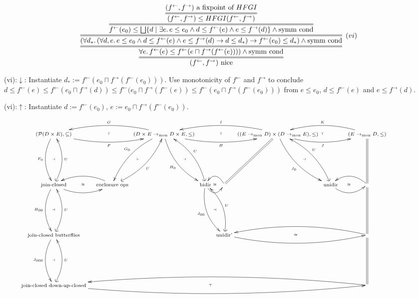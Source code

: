 \documentclass[9pt]{article}
\newcommand{\Pow}{\mathcal{P}}
\newcommand{\tomon}{\to_{\mathrm{mon}}}
\newcommand{\ff}{{f^{\rightarrow}}}
\newcommand{\fb}{{f^{\leftarrow}}}
\newcommand{\bigjoin}{\bigsqcup}
\newcommand{\meet}{\sqcap}
\newcommand{\con}{\wedge}
\newcommand{\imp}{\to}
\begin{document}
\[
\infer={(\fb, \ff) \textrm{~nice}}{
  \infer={\forall e.\, \fb(e) \leq \fb(e \meet \ff(\fb(e)))) \con \textrm{symm cond}}{
    \infer=[(vi)]{(\forall d_*.\, (\forall d,e.\, e \leq e_0 \con d \leq \fb(e) \con e \leq \ff(d) \imp d \leq d_*) \imp \fb(e_0) \leq d_*) \con \textrm{symm cond}}{
      \infer={\fb(e_0) \leq \bigjoin \{d \mid \exists e.\, e \leq e_0 \con d \leq \fb(e) \con e \leq \ff(d)\} \con \textrm{symm cond}}{
        \infer={(\fb,\ff) \leq HFGI(\fb,\ff)}{
          (\fb,\ff) \textrm{~a fixpoint of $HFGI$}
        }
      }
    }
  }
}  
\]  

(vi):$\downarrow$: Instantiate $d_* := \fb(e_0 \meet \ff(\fb(e_0)))$.
Use monotonicity of $\fb$ and $\ff$ to conclude
$d \leq \fb(e) \leq \fb(e_0 \meet \ff(d)) \leq
\fb(e_0 \meet \ff(\fb(e)) \leq \fb(e_0 \meet \ff(\fb(e_0)))$ from $e \leq e_0$,
$d \leq \fb(e)$ and $e \leq \ff(d)$.

(vi):$\uparrow$: Instantiate $d := \fb(e_0)$,
$e := e_0 \meet \ff(\fb(e_0))$.




\[
  \scriptsize
\hspace*{-1.5cm}  
\xymatrix@R=5pc@C=0.1pc{  
  (\Pow(D \times E), \subseteq) \ar@/_1pc/[rrr]_{F} \ar@{}[rrr]|{\top}
  \ar@/_1pc/[d]_{F_0}  \ar@{}[d]|{\dashv}
& & & (D \times E \tomon D \times E, \leq) \ar@/_1pc/[rrr]_{H} \ar@{}[rrr]|{\top}
\ar@/_1pc/[lll]_{G}
\ar@/_1pc/[dl]_{G_0} \ar@{}[dl]|{\vdash}
\ar@/_1pc/[dr]_{H_0} \ar@{}[dr]|{\dashv}
      & & & ((E \tomon D) \times (D \tomon E), \leq)
      \ar@/_1pc/[lll]_{I} \ar@{=}[dl]
      \ar@/_1pc/[rrr]_{J} \ar@{}[rrr]|{\top}
       \ar@/_1pc/[dr]_{J_0} \ar@{}[dr]|{\dashv}
             & & & (E \tomon D, \leq) \ar@{=}[d]
                \ar@/_1pc/[lll]_{K} \\
\textrm{join-closed} \ar@/_1pc/[rr] \ar@{}[rr]|{\cong}
        \ar@/_1pc/[d]_{H_{00}} \ar@{}[d]|{\dashv} \ar@{(->}@/_1pc/[u]_{U}      & & \textrm{coclosure ops} \ar@/_1pc/[ll]  \ar@{(->}@/_1pc/[ur]_{U}   
    & & \textrm{bidir} \ar@/_1pc/[r] \ar@{}[r]|{\cong}  \ar@{(->}@/_1pc/[ul]_U
   \ar@/_1pc/[dr]_{J_{00}} \ar@{}[dr]|{\dashv}
        & \ar@/_1pc/[l] 
          & & \textrm{unidir} \ar@/_1pc/[rr] \ar@{}[rr]|{\cong}  \ar@{(->}@/_1pc/[ul]_U
          & & \ar@/_1pc/[ll] \ar@{=}[d]\\
\textrm{join-closed butterflies} 
    \ar@/_1pc/[d]_{J_{000}} \ar@{}[d]|{\dashv} \ar@{(->}@/_1pc/[u]_{U}
& & 
    & & & \textrm{unidir'} \ar@{(->}@/_1pc/[ul]_{U}
            \ar@/_1pc/[rrrr] \ar@{}[rrrr]|{\cong}
          & 
            & & & \ar@{=}[d] \ar@/_1pc/[llll] \\
\textrm{join-closed down-up-closed} \ar@{(->}@/_1pc/[u]_{U} \ar@/_1pc/[rrrrrrrrr] \ar@{}[rrrrrrrrr]|{\top}
& & & & & & & & &  \ar@/_1pc/[lllllllll]            
}
\]  
\end{document}
